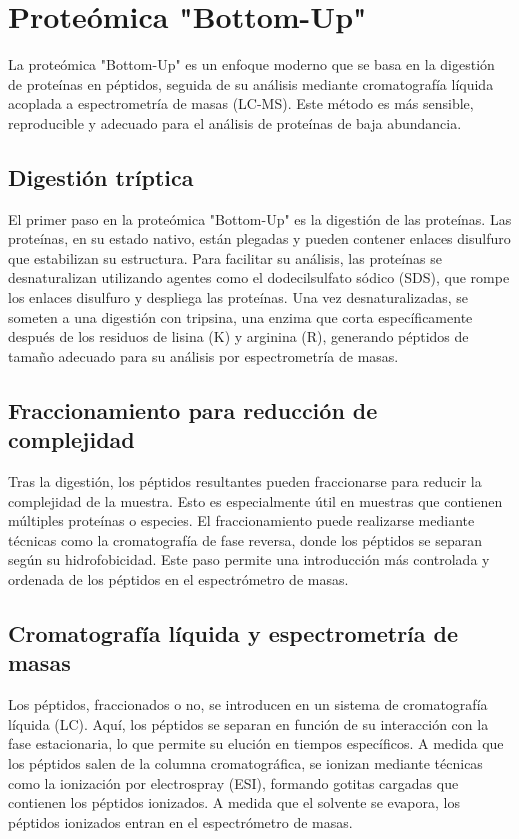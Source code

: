\section{Proteómica "Bottom-Up"}
La proteómica "Bottom-Up" es un enfoque moderno que se basa en la digestión de proteínas en péptidos, seguida de su análisis mediante cromatografía líquida acoplada a espectrometría de masas (LC-MS). Este método es más sensible, reproducible y adecuado para el análisis de proteínas de baja abundancia.

\subsection{Digestión tríptica}
El primer paso en la proteómica "Bottom-Up" es la digestión de las proteínas. Las proteínas, en su estado nativo, están plegadas y pueden contener enlaces disulfuro que estabilizan su estructura. Para facilitar su análisis, las proteínas se desnaturalizan utilizando agentes como el dodecilsulfato sódico (SDS), que rompe los enlaces disulfuro y despliega las proteínas. Una vez desnaturalizadas, se someten a una digestión con tripsina, una enzima que corta específicamente después de los residuos de lisina (K) y arginina (R), generando péptidos de tamaño adecuado para su análisis por espectrometría de masas.

\subsection{Fraccionamiento para reducción de complejidad}
Tras la digestión, los péptidos resultantes pueden fraccionarse para reducir la complejidad de la muestra. Esto es especialmente útil en muestras que contienen múltiples proteínas o especies. El fraccionamiento puede realizarse mediante técnicas como la cromatografía de fase reversa, donde los péptidos se separan según su hidrofobicidad. Este paso permite una introducción más controlada y ordenada de los péptidos en el espectrómetro de masas.

\subsection{Cromatografía líquida y espectrometría de masas}
Los péptidos, fraccionados o no, se introducen en un sistema de cromatografía líquida (LC). Aquí, los péptidos se separan en función de su interacción con la fase estacionaria, lo que permite su elución en tiempos específicos. A medida que los péptidos salen de la columna cromatográfica, se ionizan mediante técnicas como la ionización por electrospray (ESI), formando gotitas cargadas que contienen los péptidos ionizados. A medida que el solvente se evapora, los péptidos ionizados entran en el espectrómetro de masas.

